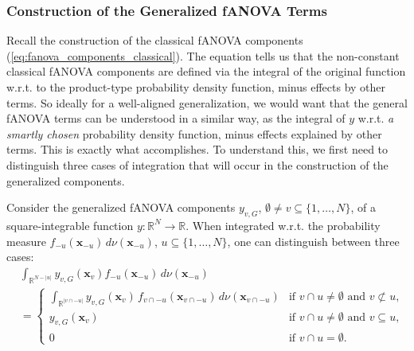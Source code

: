 \subsubsection{Construction of the Generalized fANOVA Terms}
Recall the construction of the classical fANOVA components (\autoref{eq:fanova_components_classical}). The equation tells us that the non-constant classical fANOVA components are defined via the integral of the original function w.r.t. to the product-type probability density function, minus effects by other terms. So ideally for a well-aligned generalization, we would want that the general fANOVA terms can be understood in a similar way, as the integral of $y$ w.r.t. \textit{a smartly chosen} probability density function, minus effects explained by other terms.
This is exactly what \cite{rahman2014} accomplishes.
To understand this, we first need to distinguish three cases of integration that will occur in the construction of the generalized components.
\begin{proposition}\label{prop:generalized_fanova_integration_cases}
Consider the generalized fANOVA components $y_{v,G}$, $\emptyset \ne v \subseteq \{1,\dots,N\}$, of a square-integrable function $y : \mathbb{R}^N \to \mathbb{R}$. When integrated w.r.t. the probability measure $f_{-u}(\boldsymbol{x}_{-u})\, d \nu(\boldsymbol{x}_{-u})$, $u \subseteq \{1,\dots,N\}$, one can distinguish between three cases:
\begin{equation}
\begin{aligned}
& \int_{\mathbb{R}^{N - |u|}} y_{v,G}(\boldsymbol{x}_v) 
    f_{-u}(\boldsymbol{x}_{-u}) \, d \nu(\boldsymbol{x}_{-u}) \\[0.5em]
&= 
\begin{cases}
    \displaystyle 
    \int_{\mathbb{R}^{|v \cap -u|}} 
        y_{v,G}(\boldsymbol{x}_v)\,
        f_{v \cap -u}(\boldsymbol{x}_{v \cap -u})\,
        d \nu(\boldsymbol{x}_{v \cap -u}) 
        & \text{if } v \cap u \ne \emptyset \text{ and } v \not\subset u, \\[1ex]
    y_{v,G}(\boldsymbol{x}_v) 
        & \text{if } v \cap u \ne \emptyset \text{ and } v \subseteq u, \\[1ex]
    0 
        & \text{if } v \cap u = \emptyset.
\end{cases}
\end{aligned}
\end{equation}
\end{proposition}
